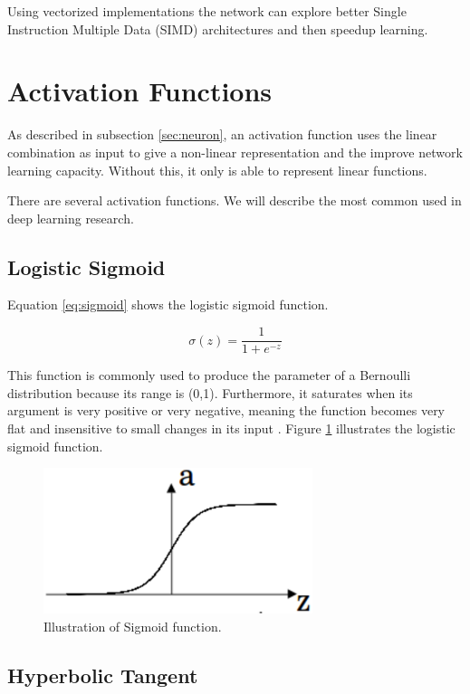Using vectorized implementations the network can explore better Single Instruction Multiple Data (SIMD) architectures and then speedup learning.

\section{Activation Functions}\label{sec:activationfunction}
As described in subsection \ref{sec:neuron}, an activation function uses the linear combination as input to give a non-linear representation and the improve network learning capacity. Without this, it only is able to represent linear functions.

There are several activation functions. We will describe the most common used in deep learning research.

\subsection{Logistic Sigmoid}

Equation \ref{eq:sigmoid} shows the logistic sigmoid function.

\begin{equation}
\sigma(z) = \frac{1}{1 + e^{-z}}
\label{eq:sigmoid}
\end{equation}

This function is commonly used to produce the parameter of a Bernoulli distribution because its range is (0,1). Furthermore, it saturates when its argument is very positive or very negative, meaning the function becomes very flat and insensitive to small changes in its input \cite{Goodfellow-et-al-2016}. Figure \ref{fig:sigmoid} illustrates the logistic sigmoid function.

\begin{figure}[!htbp]
	\centering
	\includegraphics[width=0.7\textwidth]{Cap3/sigmoid.eps}
	\caption{Illustration of Sigmoid function.}
	\label{fig:sigmoid}
\end{figure}

\subsection{Hyperbolic Tangent}

